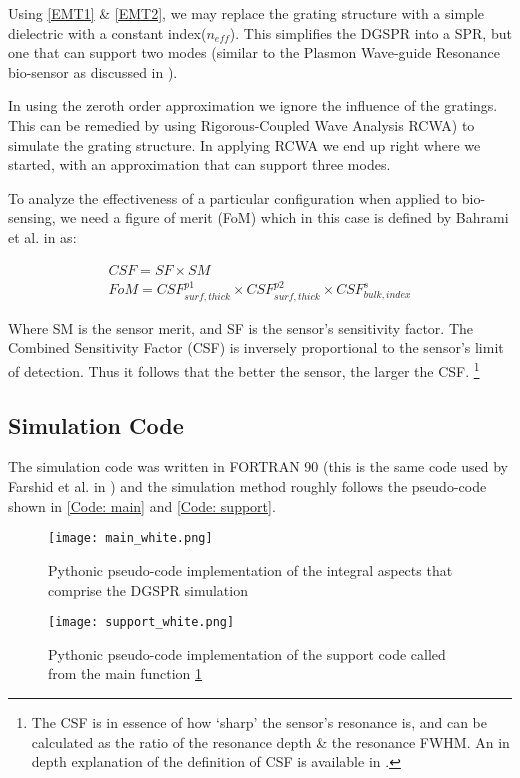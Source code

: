 Using \autoref{EMT1} \& \autoref{EMT2}, we may replace the grating structure with a simple dielectric with a constant index($n_{eff}$). This simplifies the DGSPR into a SPR, but one that can support two modes (similar to the Plasmon Wave-guide Resonance bio-sensor as discussed in \cite{farshid_conf}). 

In using the zeroth order approximation we ignore the influence of the gratings. This can be remedied by using Rigorous-Coupled Wave Analysis RCWA) to simulate the grating structure. In applying RCWA we end up right where we started, with an approximation that can support three modes. 

To analyze the effectiveness of a particular configuration when applied to bio-sensing, we need a figure of merit (FoM) which in this case is defined by Bahrami et al. in \cite{farshid_ol} as:

\begin{eqnarray}\label{FOM}
CSF = SF \times SM \\
FoM = CSF^{p1}_{surf,thick} \times CSF^{p2}_{surf,thick} \times CSF^{s}_{bulk,index}
\end{eqnarray}

Where SM is the sensor merit, and SF is the sensor's sensitivity factor. The Combined Sensitivity Factor (CSF) is inversely proportional to the sensor's limit of detection. Thus it follows that the better the sensor, the larger the CSF. \footnote{The CSF is in essence of how `sharp' the sensor's resonance is, and can be calculated as the ratio of the resonance depth \& the resonance FWHM. An in depth explanation of the definition of CSF is available in \cite{CSF_def}.}

\subsection{Simulation Code}

The simulation code was written in FORTRAN 90 (this is the same code used by Farshid et al. in \cite{farshid_ol}) and the simulation method roughly follows the pseudo-code shown in \autoref{Code: main} and \autoref{Code: support}.

\begin{figure}
\texttt{[image: main\_white.png]}
\caption{Pythonic pseudo-code implementation of the integral aspects that comprise the DGSPR simulation}
\label{Code: main}
\end{figure}

\begin{figure}
\texttt{[image: support\_white.png]}
\caption{Pythonic pseudo-code implementation of the support code called from the main function \ref{Code: main}}
\label{Code: support}
\end{figure}

